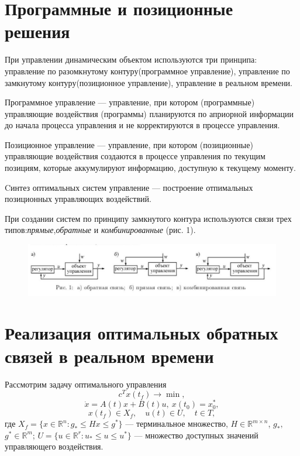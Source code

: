 \section{Программные и позиционные решения}\label{1sec:Solution}

При управлении динамическим объектом используются три принципа: управление по разомкнутому контуру(программное управление), управление по замкнутому контуру(позиционное управление), управление в реальном времени.
\begin{definition} 
Программное управление — управление, при котором (программные) управляющие воздействия (программы) планируются по априорной информации до начала процесса управления и не корректируются в процессе управления. 
\end{definition}
\begin{definition} 
Позиционное управление — управление, при котором (позиционные) управляющие воздействия создаются в процессе управления по текущим позициям, которые аккумулируют информацию, доступную к текущему моменту.
\end{definition}
\begin{definition} 
Cинтез оптимальных систем управление — построение отпимальных позиционных управляющих воздействий.
\end{definition}
При создании систем по принципу замкнутого контура используются связи трех типов:\emph{прямые},\emph{обратные} и \emph{комбинированные} (рис. 1).
\begin{figure}[h]

\centering

\includegraphics[width=\linewidth]{image.jpg}


\label{fig:mpr}

\end{figure}

\section{Реализация оптимальных обратных связей в реальном времени}\label{1sec:Feedback}
Рассмотрим задачу оптимального управления
\begin{equation} \label{1problem}
    c^Tx(t_f)\to \min,
    \end{equation}
$$
    \dot{x}=A(t)x+B(t)u,\ x(t_0)=x_0^*,
    $$
$$
    x(t_f) \in X_f,\quad  u(t)\in U, \quad  t\in T,
    $$
где  $X_f=\{x\in \mathbb{R}^n: g_*\leq Hx \leq g^*\}$ --- терминальное
множество, $H\in \mathbb{R}^{m\times n}$, $g_*,$ $g^* \in \mathbb{R}^m$;
$U=\{u\in \mathbb{R}^r: u_*\le u\le u^*\}$ --- множество доступных значений
управляющего воздействия.

